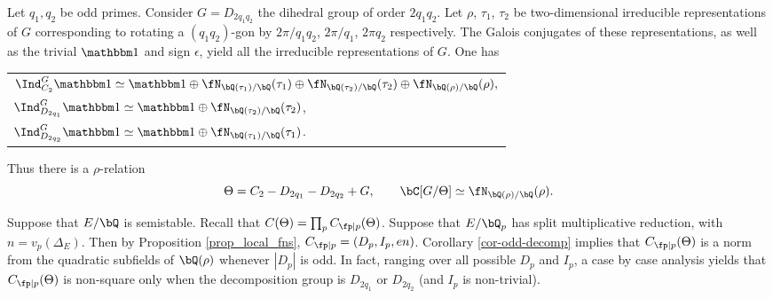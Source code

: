 \begin{example}[Dihedral]
    Let $q_1, q_2$ be odd primes. Consider $G = D_{2 q_1 q_2}$ the dihedral group of order $2 q_1 q_2$. 
    Let $\rho$, $\tau_1$, $\tau_2$ be two-dimensional irreducible representations of $G$ corresponding to rotating a $(q_1 q_2)$-gon by $2 \pi / q_1 q_2$, $2 \pi / q_1$, $2 \pi q_2$ respectively. The Galois conjugates of these representations, as well as the trivial $\trivial$ and sign $\epsilon$, yield all the irreducible representations of $G$. One has
    \begin{table}[H]
        \centering
    \begin{tabular}{l}
        $\Ind_{C_2}^G \trivial \simeq \trivial \oplus \repnorm{\tau_1} \oplus \repnorm{\tau_2} \oplus \repnorm{\rho},$ \\
        $\Ind_{D_{2 q_1}}^G \trivial \simeq \trivial \oplus \repnorm{\tau_2}$,\\
        $\Ind_{D_{2 q_2}}^G \trivial \simeq \trivial \oplus \repnorm{\tau_1}$.
    \end{tabular}
\end{table}
Thus there is a $\rho$-relation $$\Theta = C_2 - D_{2 q_1} - D_{2 q_2} + G, \qquad \bC[G / \Theta] \simeq \repnorm{\rho}.$$ 

    Suppose that $E / \bQ$ is semistable. Recall that $C(\Theta) = \prod_p C_{\fp \mid p}(\Theta)$. Suppose that $E / \bQ_p$ has split multiplicative reduction, with $n = v_p(\Delta_E)$. Then by Proposition \ref{prop_local_fns}, $C_{\fp \mid p} = (D_p, I_p, en)$. Corollary \ref{cor-odd-decomp} implies that $C_{\fp \mid p}(\Theta)$ is a norm from the quadratic subfields of $\bQ(\rho)$ whenever $|D_p|$ is odd. In fact, ranging over all possible $D_p$ and $I_p$, a case by case analysis yields that $C_{\fp \mid p}(\Theta)$ is non-square only when the decomposition group is $D_{2 q_1}$ or $D_{2 q_2}$ (and $I_p$ is non-trivial). 


\end{example}
